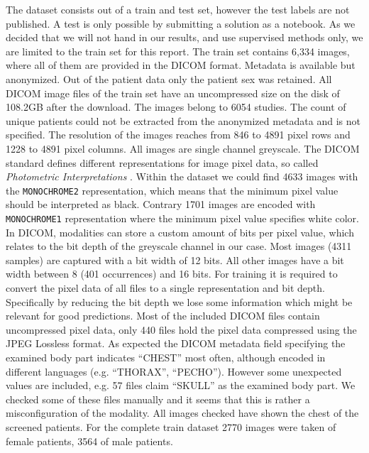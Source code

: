 The dataset consists out of a train and test set, however the test labels are not published. A test is only possible by submitting a solution as a notebook. As we decided that we will not hand in our results, and use supervised methods only, we are limited to the train set for this report. The train set contains 6,334 images, where all of them are provided in the DICOM format. Metadata is available but anonymized. Out of the patient data only the patient sex was retained. All DICOM image files of the train set have an uncompressed size on the disk of \num{108.2}GB after the download. The images belong to \num{6054} studies. The count of unique patients could not be extracted from the anonymized metadata and is not specified. The resolution of the images reaches from \num{846} to \num{4891} pixel rows and \num{1228} to \num{4891} pixel columns. All images are single channel greyscale. The DICOM standard defines different representations for image pixel data, so called \textit{Photometric Interpretations} \autocite{dicom2018}. Within the dataset we could find \num{4633} images with the \texttt{MONOCHROME2} representation, which means that the minimum pixel value should be interpreted as black. Contrary \num{1701} images are encoded with \texttt{MONOCHROME1} representation where the minimum pixel value specifies white color. In DICOM, modalities can store a custom amount of bits per pixel value, which relates to the bit depth of the greyscale channel in our case. Most images (\num{4311} samples) are captured with a bit width of 12 bits. All other images have a bit width between 8 (\num{401} occurrences) and 16 bits. For training it is required to convert the pixel data of all files to a single representation and bit depth. Specifically by reducing the bit depth we lose some information which might be relevant for good predictions. Most of the included DICOM files contain uncompressed pixel data, only 440 files hold the pixel data compressed using the JPEG Lossless format. As expected the DICOM metadata field specifying the examined body part indicates \enquote{CHEST} most often, although encoded in different languages (e.g. \enquote{THORAX}, \enquote{PECHO}). However some unexpected values are included, e.g. \num{57} files claim \enquote{SKULL} as the examined body part. We checked some of these files manually and it seems that this is rather a misconfiguration of the modality. All images checked have shown the chest of the screened patients. For the complete train dataset \num{2770} images were taken of female patients, \num{3564} of male patients.

